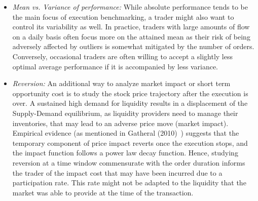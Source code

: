 \begin{itemize}
\item \emph{Mean vs. Variance of performance:} While absolute performance tends to be the main focus of execution benchmarking, a trader might also want to control its variability as well. In practice, traders with large amounts of flow on a daily basis often focus more on the attained mean as their risk of being adversely affected by outliers is somewhat mitigated by the number of orders. Conversely, occasional traders are often willing to accept a slightly less optimal average performance if it is accompanied by less variance.

\item \emph{Reversion:} An additional way to analyze market impact or short term opportunity cost is to study the stock price trajectory after the execution is over. A sustained high demand for liquidity results in a displacement of the Supply-Demand equilibrium, as liquidity providers need to manage their inventories, that may lead to an adverse price move (market impact). Empirical evidence (as mentioned in Gatheral (2010)~\cite{gatheral}) suggests that the temporary component of price impact reverts once the execution stops, and the impact function follows a power law decay function. Hence, studying reversion at a time window commensurate with the order duration informs the trader of the impact cost that may have been incurred due to a participation rate. This rate might not be adapted to the liquidity that the market was able to provide at the time of the transaction.


\end{itemize}
